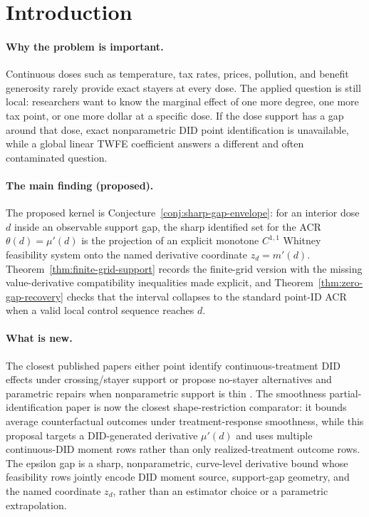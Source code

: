 \documentclass[11pt]{article}
\theoremstyle{definition}
\theoremstyle{plain}
\theoremstyle{remark}
\begin{document}
\section{Introduction}
\paragraph{Why the problem is important.}
Continuous doses such as temperature, tax rates, prices, pollution, and benefit generosity rarely provide exact stayers at every dose.  The applied question is still local: researchers want to know the marginal effect of one more degree, one more tax point, or one more dollar at a specific dose.  If the dose support has a gap around that dose, exact nonparametric DID point identification is unavailable, while a global linear TWFE coefficient answers a different and often contaminated question.

\paragraph{The main finding (proposed).}
The proposed kernel is Conjecture~\ref{conj:sharp-gap-envelope}: for an interior dose \(d\) inside an observable support gap, the sharp identified set for the ACR \(\theta(d)=\mu'(d)\) is the projection of an explicit monotone \(C^{1,1}\) Whitney feasibility system onto the named derivative coordinate \(z_d=m'(d)\).  Theorem~\ref{thm:finite-grid-support} records the finite-grid version with the missing value-derivative compatibility inequalities made explicit, and Theorem~\ref{thm:zero-gap-recovery} checks that the interval collapses to the standard point-ID ACR when a valid local control sequence reaches \(d\).

\paragraph{What is new.}
The closest published papers either point identify continuous-treatment DID effects under crossing/stayer support \citep{DHaultfoeuilleHoderleinSasaki2023,deChaisemartinDHaultfoeuillePasquierSowVazquezBare2022} or propose no-stayer alternatives and parametric repairs when nonparametric support is thin \citep{deChaisemartinDHaultfoeuilleVazquezBare2024,deChaisemartinCicciaDHaultfoeuilleKnau2024}.  The smoothness partial-identification paper \citet{KimKwonKwonLee2018} is now the closest shape-restriction comparator: it bounds average counterfactual outcomes under treatment-response smoothness, while this proposal targets a DID-generated derivative \(\mu'(d)\) and uses multiple continuous-DID moment rows rather than only realized-treatment outcome rows.  The epsilon gap is a sharp, nonparametric, curve-level derivative bound whose feasibility rows jointly encode DID moment source, support-gap geometry, and the named coordinate \(z_d\), rather than an estimator choice or a parametric extrapolation.
\end{document}
